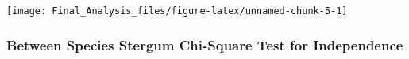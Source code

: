 \begin{Shaded}
\begin{Highlighting}[]
\NormalTok{, }\NormalTok{, }\NormalTok{, } \NormalTok{(}\NormalTok{))}
\end{Highlighting}
\end{Shaded}

\begin{center}\texttt{[image: Final\_Analysis\_files/figure-latex/unnamed-chunk-5-1]} \end{center}

\subsubsection{Between Species Stergum Chi-Square Test for
Independence}\label{between-species-stergum-chi-square-test-for-independence}

\begin{Shaded}
\begin{Highlighting}[]
\NormalTok{(} \NormalTok{, } \NormalTok{)}
\end{Highlighting}
\end{Shaded}

